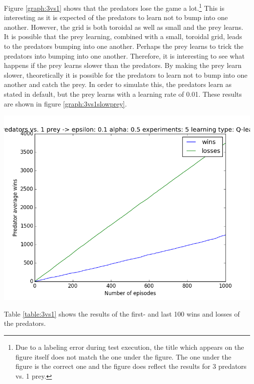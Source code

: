 \newcommand{\labelerrorfootnote}{\footnote{Due to a labeling error during test execution, the title which appears on the figure itself does not match the one under the figure. The one under the figure is the correct one and the figure does reflect the results for 3 predators vs. 1 prey.}}

Figure \ref{graph:3vs1} shows that the predators lose the game a lot.\labelerrorfootnote \: This is interesting as it is expected of the predators to learn not to bump into one another. However, the grid is both toroidal as well as small and the prey learns. It is possible that the prey learning, combined with a small, toroidal grid, leads to the predators bumping into one another. Perhaps the prey learns to trick the predators into bumping into one another. Therefore, it is interesting to see what happens if the prey learns slower than the predators. By making the prey learn slower, theoretically it is possible for the predators to learn not to bump into one another and catch the prey. In order to simulate this, the predators learn as stated in default, but the prey learns with a learning rate of 0.01. These results are shown in figure \ref{graph:3vs1slowprey}.

\begin{center}
	\includegraphics[scale=0.3]{smaller_learning_rate_prey}
	\label{graph:3vs1slowprey}
\end{center}

Table \ref{table:3vs1} shows the results of the first- and last 100 wins and losses of the predators.

